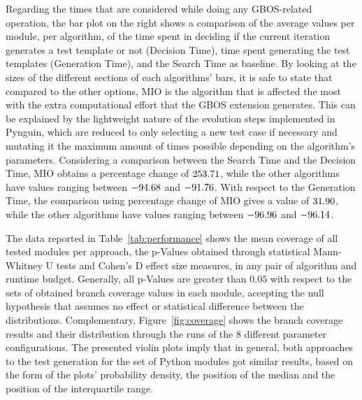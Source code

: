 \documentclass[%
  chapterprefix=false,%
  open=right,%
  twoside=true,%
  paper=a4,%
  logofile={Figures/logo.png},%
  thesistype=master,%
  UKenglish,%
]{se2thesis}
\begin{document}
Regarding the times that are considered while doing any GBOS-related operation, the bar plot on the right shows a comparison of the average values per module, per algorithm, of the time spent in deciding if the current iteration generates a test template or not (Decision Time), time spent generating the test templates (Generation Time), and the Search Time as baseline.
By looking at the sizes of the different sections of each algorithms' bars, it is safe to state that compared to the other options, MIO is the algorithm that is affected the most with the extra computational effort that the GBOS extension generates.
This can be explained by the lightweight nature of the evolution steps implemented in Pynguin, which are reduced to only selecting a new test case if necessary and mutating it the maximum amount of times possible depending on the algorithm's parameters.
Considering a comparison between the Search Time and the Decision Time, MIO obtains a percentage change of \(253.71\), while the other algorithms have values ranging between \(-94.68\) and \(-91.76\).
With respect to the Generation Time, the comparison using percentage change of MIO gives a value of \(31.90\), while the other algorithms have values ranging between \(-96.96\) and \(-96.14\).

The data reported in Table~\ref{tab:performance} shows the mean coverage of all tested modules per approach, the p-Values obtained through statistical Mann-Whitney U tests and Cohen's D effect size measures, in any pair of algorithm and runtime budget.
Generally, all p-Values are greater than \(0.05\) with respect to the sets of obtained branch coverage values in each module, accepting the null hypothesis that assumes no effect or statistical difference between the distributions.
Complementary, Figure~\ref{fig:coverage} shows the branch coverage results and their distribution through the runs of the 8 different parameter configurations.
The presented violin plots imply that in general, both approaches to the test generation for the set of Python modules got similar results, based on the form of the plots' probability density, the position of the median and the position of the interquartile range.
\end{document}
